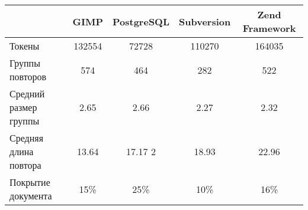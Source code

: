 \begin{minipage}{0.9\textwidth}
\begin{adjustbox}{center}
\begin{tabular}{|l||c|c|c|c|}
	\hline
	& GIMP & PostgreSQL & Subversion & Zend Framework \\
	\hline
	\hline
	Токены & 132554  & 72728  & 110270  & 164035 \\
	\hline
	Группы повторов & 574  &464   &282   & 522  \\
	\hline
	Средний размер группы & 2.65 & 2.66& 2.27 &  2.32 \\
	\hline
	Средняя длина повтора & 13.64 &17.17 2 & 18.93 & 22.96 \\
	\hline
	Покрытие документа & 15\% & 25\% & 10\% & 16\% \\
	\hline
	
\end{tabular}
\end{adjustbox}
\end{minipage}
